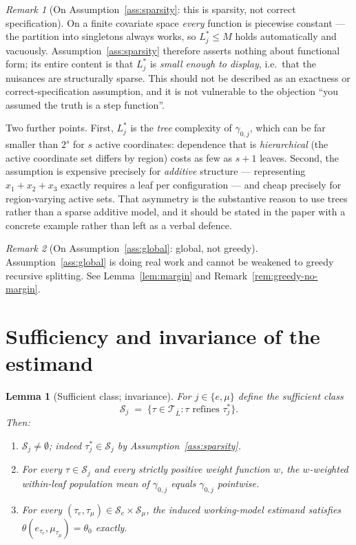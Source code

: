 \documentclass[11pt]{article}
\theoremstyle{plain}
\newtheorem{lemma}{Lemma}
\theoremstyle{definition}
\theoremstyle{remark}
\newtheorem{remark}{Remark}
\newcommand{\cT}{\mathcal{T}}
\newcommand{\cS}{\mathcal{S}}
\begin{document}
\begin{remark}[On Assumption~\ref{ass:sparsity}: this is sparsity, not correct
specification]\label{rem:not-exactness}
On a finite covariate space \emph{every} function is piecewise constant --- the
partition into singletons always works, so $L^*_j\le M$ holds automatically and
vacuously. Assumption~\ref{ass:sparsity} therefore asserts nothing about
functional form; its entire content is that $L^*_j$ is \emph{small enough to
display}, i.e.\ that the nuisances are structurally sparse. This should not be
described as an exactness or correct-specification assumption, and it is not
vulnerable to the objection ``you assumed the truth is a step function''.

Two further points. First, $L^*_j$ is the \emph{tree} complexity of
$\gamma_{0,j}$, which can be far smaller than $2^{s}$ for $s$ active
coordinates: dependence that is \emph{hierarchical} (the active coordinate set
differs by region) costs as few as $s+1$ leaves. Second, the assumption is
expensive precisely for \emph{additive} structure --- representing
$x_1+x_2+x_3$ exactly requires a leaf per configuration --- and cheap precisely
for region-varying active sets. That asymmetry is the substantive reason to use
trees rather than a sparse additive model, and it should be stated in the paper
with a concrete example rather than left as a verbal defence.
\end{remark}

\begin{remark}[On Assumption~\ref{ass:global}: global, not greedy]\label{rem:global}
Assumption~\ref{ass:global} is doing real work and cannot be weakened to greedy
recursive splitting. See Lemma~\ref{lem:margin} and
Remark~\ref{rem:greedy-no-margin}.
\end{remark}

\section{Sufficiency and invariance of the estimand}

\begin{lemma}[Sufficient class; invariance]\label{lem:invariance}
For $j\in\{e,\mu\}$ define the \emph{sufficient class}
\[
  \cS_j \;=\; \{\tau\in\cT_{\bar L} : \tau \text{ refines } \tau^*_j\}.
\]
Then:
\begin{enumerate}[nosep,label=(\roman*)]
  \item $\cS_j\neq\emptyset$; indeed $\tau^*_j\in\cS_j$ by
        Assumption~\ref{ass:sparsity}.
  \item For every $\tau\in\cS_j$ and every strictly positive weight function $w$,
        the $w$-weighted within-leaf population mean of $\gamma_{0,j}$ equals
        $\gamma_{0,j}$ pointwise.
  \item For every $(\tau_e,\tau_\mu)\in\cS_e\times\cS_\mu$, the induced
        working-model estimand satisfies
        $\theta(e_{\tau_e},\mu_{\tau_\mu})=\theta_0$ \emph{exactly}.
\end{enumerate}
\end{lemma}
\end{document}
